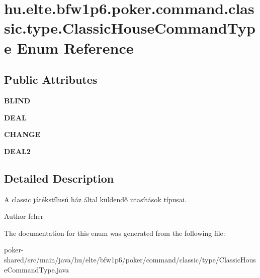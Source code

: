 \hypertarget{enumhu_1_1elte_1_1bfw1p6_1_1poker_1_1command_1_1classic_1_1type_1_1_classic_house_command_type}{}\section{hu.\+elte.\+bfw1p6.\+poker.\+command.\+classic.\+type.\+Classic\+House\+Command\+Type Enum Reference}
\label{enumhu_1_1elte_1_1bfw1p6_1_1poker_1_1command_1_1classic_1_1type_1_1_classic_house_command_type}
\subsection*{Public Attributes}
\begin{DoxyCompactItemize}
\item 
\hypertarget{enumhu_1_1elte_1_1bfw1p6_1_1poker_1_1command_1_1classic_1_1type_1_1_classic_house_command_type_a488083277b7fff93d4b155f4d4cdf821}{}{\bfseries B\+L\+I\+N\+D}\label{enumhu_1_1elte_1_1bfw1p6_1_1poker_1_1command_1_1classic_1_1type_1_1_classic_house_command_type_a488083277b7fff93d4b155f4d4cdf821}

\item 
\hypertarget{enumhu_1_1elte_1_1bfw1p6_1_1poker_1_1command_1_1classic_1_1type_1_1_classic_house_command_type_a299acd13d735220bfe71a468f3474e49}{}{\bfseries D\+E\+A\+L}\label{enumhu_1_1elte_1_1bfw1p6_1_1poker_1_1command_1_1classic_1_1type_1_1_classic_house_command_type_a299acd13d735220bfe71a468f3474e49}

\item 
\hypertarget{enumhu_1_1elte_1_1bfw1p6_1_1poker_1_1command_1_1classic_1_1type_1_1_classic_house_command_type_a95c3ff40a1e1212824999b38606bb8c9}{}{\bfseries C\+H\+A\+N\+G\+E}\label{enumhu_1_1elte_1_1bfw1p6_1_1poker_1_1command_1_1classic_1_1type_1_1_classic_house_command_type_a95c3ff40a1e1212824999b38606bb8c9}

\item 
\hypertarget{enumhu_1_1elte_1_1bfw1p6_1_1poker_1_1command_1_1classic_1_1type_1_1_classic_house_command_type_a3abef4b380a12fc16c7b2fb2d0d28e02}{}{\bfseries D\+E\+A\+L2}\label{enumhu_1_1elte_1_1bfw1p6_1_1poker_1_1command_1_1classic_1_1type_1_1_classic_house_command_type_a3abef4b380a12fc16c7b2fb2d0d28e02}

\end{DoxyCompactItemize}


\subsection{Detailed Description}
A classic játékstílusú ház által küldendő utasítások típusai. \begin{DoxyAuthor}{Author}
feher 
\end{DoxyAuthor}


The documentation for this enum was generated from the following file\+:\begin{DoxyCompactItemize}
\item 
poker-\/shared/src/main/java/hu/elte/bfw1p6/poker/command/classic/type/Classic\+House\+Command\+Type.\+java\end{DoxyCompactItemize}

